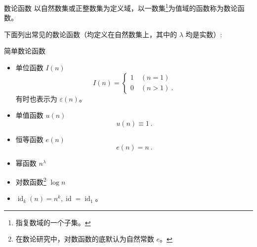 

\begin{issues}
\issueDraft
\issueMissDepend
\end{issues}

\begin{definition}{数论函数}
以自然数集或正整数集为定义域，以一数集\footnote{指复数域的一个子集。}为值域的函数称为数论函数。
\end{definition}

下面列出常见的数论函数（均定义在自然数集上，其中的 $\lambda$ 均是实数）:
\begin{example}{简单数论函数}
\begin{itemize}
\item 单位函数 $I(n)$
\begin{equation}
I(n) =
\begin{cases}
1\quad (n = 1)\\
0\quad (n > 1)~.
\end{cases}
\end{equation}
有时也表示为 $\varepsilon(n)$。
\item 单值函数 $u(n)$
\begin{equation}
u(n)\equiv1~.
\end{equation}
\item 恒等函数 $e(n)$
\begin{equation}
e(n)=n~.
\end{equation}
\item 幂函数 $n^\lambda$
\item 对数函数\footnote{在数论研究中，对数函数的底默认为自然常数 $e$。} $\log n$
\item $\operatorname{id}_k(n) = n^k, \operatorname{id} = \operatorname{id}_1$。
\end{itemize}
\end{example}
